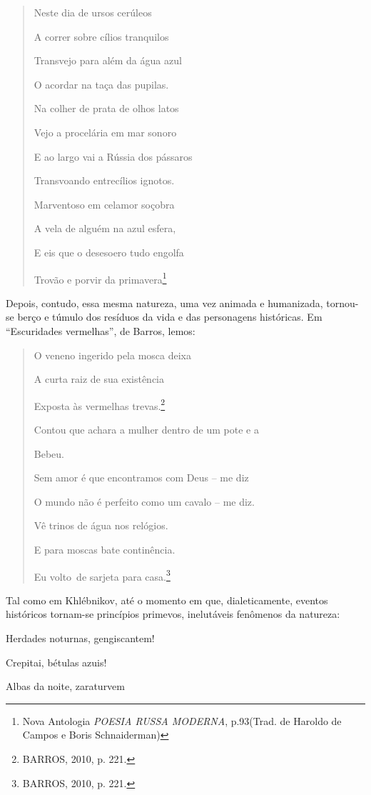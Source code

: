 \begin{quote}
Neste dia de ursos cerúleos

A correr sobre cílios tranquilos

Transvejo para além da água azul

O acordar na taça das pupilas.

Na colher de prata de olhos latos

Vejo a procelária em mar sonoro

E ao largo vai a Rússia dos pássaros

Transvoando entrecílios ignotos.

Marventoso em celamor soçobra

A vela de alguém na azul esfera,

E eis que o desesoero tudo engolfa

Trovão e porvir da primavera\footnote{Nova Antologia \emph{POESIA RUSSA
  MODERNA}, p.93(Trad. de Haroldo de Campos e Boris Schnaiderman)}
\end{quote}

Depois, contudo, essa mesma natureza, uma vez animada e humanizada,
tornou-se berço e túmulo dos resíduos da vida e das personagens
históricas. Em ``Escuridades vermelhas'', de Barros, lemos:

\begin{quote}
O veneno ingerido pela mosca deixa

A curta raiz de sua existência

Exposta às vermelhas trevas.\footnote{BARROS, 2010, p. 221.}

Contou que achara a mulher dentro de um pote e a

Bebeu.

Sem amor é que encontramos com Deus -- me diz

O mundo não é perfeito como um cavalo -- me diz.

Vê trinos de água nos relógios.

E para moscas bate continência.

Eu volto~de sarjeta para casa.\footnote{BARROS, 2010, p. 221.}
\end{quote}

Tal como em Khlébnikov, até o momento em que, dialeticamente, eventos
históricos tornam-se princípios primevos, inelutáveis fenômenos da
natureza:

Herdades noturnas, gengiscantem!

Crepitai, bétulas azuis!

Albas da noite, zaraturvem

